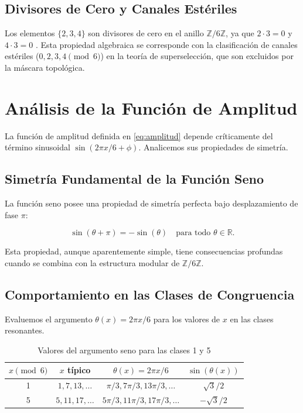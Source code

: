 \documentclass[12pt,a4paper]{article}
\theoremstyle{plain}
\theoremstyle{definition}
\theoremstyle{remark}
\begin{document}
\subsection{Divisores de Cero y Canales Estériles}

Los elementos $\{2,3,4\}$ son divisores de cero en el anillo $\mathbb{Z}/6\mathbb{Z}$, ya que $2\cdot 3 = 0$ y $4\cdot 3 = 0$ \cite{forum2007}. Esta propiedad algebraica se corresponde con la clasificación de canales estériles ($0,2,3,4 \pmod 6$) en la teoría de superselección, que son excluidos por la máscara topológica.

\section{Análisis de la Función de Amplitud}

La función de amplitud definida en \eqref{eq:amplitud} depende críticamente del término sinusoidal $\sin(2\pi x/6 + \phi)$. Analicemos sus propiedades de simetría.

\subsection{Simetría Fundamental de la Función Seno}

La función seno posee una propiedad de simetría perfecta bajo desplazamiento de fase $\pi$:

\begin{equation}
\sin(\theta + \pi) = -\sin(\theta) \quad \text{para todo } \theta \in \mathbb{R}.
\label{eq:sin_pi}
\end{equation}

Esta propiedad, aunque aparentemente simple, tiene consecuencias profundas cuando se combina con la estructura modular de $\mathbb{Z}/6\mathbb{Z}$.

\subsection{Comportamiento en las Clases de Congruencia}

Evaluemos el argumento $\theta(x) = 2\pi x/6$ para los valores de $x$ en las clases resonantes.

\begin{table}[h]
\centering
\caption{Valores del argumento seno para las clases 1 y 5}
\label{tab:argumentos}
\begin{tabular}{cccc}
\toprule
$x \pmod 6$ & $x$ típico & $\theta(x) = 2\pi x/6$ & $\sin(\theta(x))$ \\
\midrule
1 & $1,7,13,\ldots$ & $\pi/3, 7\pi/3, 13\pi/3,\ldots$ & $\sqrt{3}/2$ \\
5 & $5,11,17,\ldots$ & $5\pi/3, 11\pi/3, 17\pi/3,\ldots$ & $-\sqrt{3}/2$ \\
\bottomrule
\end{tabular}
\end{table}
\end{document}

